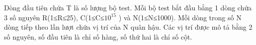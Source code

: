 Dòng đầu tiên chứa T là số lượng bộ test. Mỗi bộ test bắt đầu bằng 1 dòng chứa 3 số nguyên R(1≤R≤25), C(1≤C≤$10^{15}$    ) và N(1≤N≤1000). Mỗi dòng trong số N dòng tiếp theo lần lượt chứa vị trí của N quân hậu. Các vị trí được mô tả bằng 2 số nguyên, số đầu tiên là chỉ số hàng, số thứ hai là chỉ số cột.